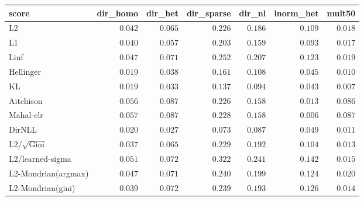 \begin{tabular}{lrrrrrr}
\toprule
score & dir\_homo & dir\_het & dir\_sparse & dir\_nl & lnorm\_het & mult50 \\
\midrule
L2 & $0.042$ & $0.065$ & $0.226$ & $0.186$ & $0.109$ & $0.018$ \\
L1 & $0.040$ & $0.057$ & $0.203$ & $0.159$ & $0.093$ & $0.017$ \\
Linf & $0.047$ & $0.071$ & $0.252$ & $0.207$ & $0.123$ & $0.019$ \\
Hellinger & $0.019$ & $0.038$ & $0.161$ & $0.108$ & $0.045$ & $0.010$ \\
KL & $\mathbf{0.019}$ & $0.033$ & $0.137$ & $0.094$ & $0.043$ & $\mathbf{0.007}$ \\
Aitchison & $0.056$ & $0.087$ & $0.226$ & $0.158$ & $0.013$ & $0.086$ \\
Mahal-clr & $0.057$ & $0.087$ & $0.228$ & $0.158$ & $\mathbf{0.006}$ & $0.087$ \\
DirNLL & $0.020$ & $\mathbf{0.027}$ & $\mathbf{0.073}$ & $\mathbf{0.087}$ & $0.049$ & $0.011$ \\
L2/$\sqrt{\mathrm{Gini}}$ & $0.037$ & $0.065$ & $0.229$ & $0.192$ & $0.104$ & $0.013$ \\
L2/learned-sigma & $0.051$ & $0.072$ & $0.322$ & $0.241$ & $0.142$ & $0.015$ \\
L2-Mondrian(argmax) & $0.047$ & $0.071$ & $0.240$ & $0.199$ & $0.124$ & $0.020$ \\
L2-Mondrian(gini) & $0.039$ & $0.072$ & $0.239$ & $0.193$ & $0.126$ & $0.014$ \\
\bottomrule
\end{tabular}